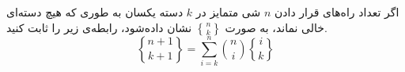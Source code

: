     \p
    اگر تعداد راه‌های قرار دادن $n$ شی متمایز در $k$ دسته یکسان به طوری که هیچ دسته‌ای خالی نماند،
    به صورت 
    $\genfrac{\{}{\}}{0pt}{}{n}{k}$
    نشان داده‌شود، رابطه‌ی زیر را ثابت کنید.        
    $$\genfrac{\{}{\}}{0pt}{}{n + 1}{k + 1} = \sum\limits_{i=k}^{n} {n\choose i} \genfrac{\{}{\}}{0pt}{}{i}{k}$$
